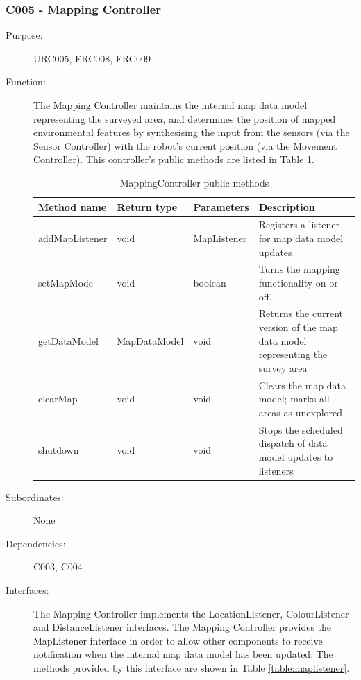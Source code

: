 \documentclass[12pt]{article}
\begin{document}
\subsubsection{C005 - Mapping Controller}
\begin{description}
\item [{Purpose:}] URC005, FRC008, FRC009
\item [{Function: }] The Mapping Controller maintains the internal map data model representing the surveyed area, and determines the position of mapped environmental features by synthesising the input from the sensors (via the Sensor Controller) with the robot's current position (via the Movement Controller). This controller's public methods are listed in Table \ref{table:mappingcontroller}.

\begin{table}
\begin{tabular}{ | p{} | p{} |p{}|p{}|}
\hline
\textbf{Method name} & \textbf{Return type} & \textbf{Parameters} & \textbf{Description} \\
\hline
addMapListener & void & MapListener & Registers a listener for map data model updates \\
\hline
setMapMode & void & boolean & Turns the mapping functionality on or off.\\
\hline
getDataModel & MapDataModel & void & Returns the current version of the map data model representing the survey area \\
\hline
clearMap & void & void & Clears the map data model; marks all areas as unexplored \\
\hline
shutdown & void & void & Stops the scheduled dispatch of data model updates to listeners \\
\hline
\end{tabular}
\caption{MappingController public methods}
\label{table:mappingcontroller}
\end{table}

\item[{Subordinates: }] None
\item[{Dependencies: }] C003, C004

\item[{Interfaces: }]  The Mapping Controller implements the LocationListener, ColourListener and DistanceListener interfaces. The Mapping Controller provides the MapListener interface in order to allow other components to receive notification when the internal map data model has been updated. The methods provided by this interface are shown in Table \ref{table:maplistener}.


\end{description}
\end{document}
